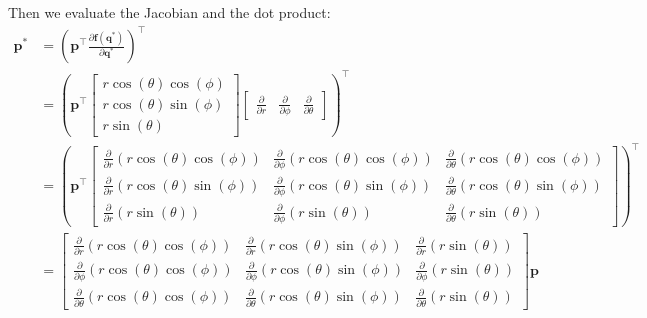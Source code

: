 \documentclass[titlepage]{article}
\begin{document}
Then we evaluate the Jacobian and the dot product:
\begin{equation}
	\begin{split}
		\boldsymbol{p}^*&=\left(\boldsymbol{p}^\top\frac{\partial\boldsymbol{f}(\boldsymbol{q}^*)}{\partial\boldsymbol{q}^*}\right)^\top \\
		&=\left(\boldsymbol{p}^\top
		\begin{bmatrix}
			r\cos(\theta)\cos(\phi) \\
			r\cos(\theta)\sin(\phi) \\
			r\sin(\theta)
		\end{bmatrix}
		\begin{bmatrix}
			\frac{\partial}{\partial r} & \frac{\partial}{\partial\phi} & \frac{\partial}{\partial\theta}
		\end{bmatrix}\right)^\top \\
		&=\left(\boldsymbol{p}^\top
		\begin{bmatrix}
			\frac{\partial}{\partial r}\left(r\cos(\theta)\cos(\phi)\right) & \frac{\partial}{\partial\phi}\left(r\cos(\theta)\cos(\phi)\right) & \frac{\partial}{\partial\theta}\left(r\cos(\theta)\cos(\phi)\right) \\
			\frac{\partial}{\partial r}\left(r\cos(\theta)\sin(\phi)\right) & \frac{\partial}{\partial\phi}\left(r\cos(\theta)\sin(\phi)\right) & \frac{\partial}{\partial\theta}\left(r\cos(\theta)\sin(\phi)\right) \\
			\frac{\partial}{\partial r}\left(r\sin(\theta)\right) & \frac{\partial}{\partial\phi}\left(r\sin(\theta)\right) & \frac{\partial}{\partial\theta}\left(r\sin(\theta)\right)
		\end{bmatrix}\right)^\top \\
		&=
		\begin{bmatrix}
			\frac{\partial}{\partial r}\left(r\cos(\theta)\cos(\phi)\right) & \frac{\partial}{\partial r}\left(r\cos(\theta)\sin(\phi)\right) & \frac{\partial}{\partial r}\left(r\sin(\theta)\right) \\
			\frac{\partial}{\partial\phi}\left(r\cos(\theta)\cos(\phi)\right) & \frac{\partial}{\partial\phi}\left(r\cos(\theta)\sin(\phi)\right) & \frac{\partial}{\partial\phi}\left(r\sin(\theta)\right) \\
			\frac{\partial}{\partial\theta}\left(r\cos(\theta)\cos(\phi)\right) & \frac{\partial}{\partial\theta}\left(r\cos(\theta)\sin(\phi)\right) & \frac{\partial}{\partial\theta}\left(r\sin(\theta)\right)
		\end{bmatrix}\boldsymbol{p} \\

\end{split}
\end{equation}
\end{document}
